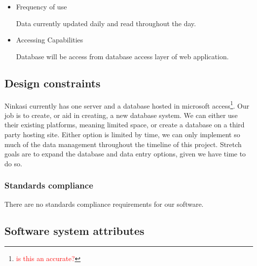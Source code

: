 \documentclass[draftclsnofoot,onecolumn,letterpaper,10pt,compsoc]{IEEEtran}
\newcommand\question[1]{\footnote{\textcolor{red}{#1}}}
\begin{document}
\begin{itemize}
\begin{itemize}
\begin{itemize}
                    \item{\textbf{S.G.}:
                        \question{What is this?}
                    }
                    \item{\textbf{pH}: pH level of batch in brewing vat.}
                    \item{\textbf{ABV}: Alcohol By Volumne of batch.}
                    \item{\textbf{Temp}: Temperature of batch.}
                    \item{\textbf{Action}: Action to be taken.}
                    \item{\textbf{By}: 
                        \question{Is this the person taking the action?}
                    }
                \end{itemize}
            \end{itemize}
        \item{Frequency of use}
        
            Data currently updated daily and read throughout the day.
            
        \item{Accessing Capabilities}
        
            Database will be access from database access layer of web application.
    \end{itemize}

	\subsection{Design constraints}
		Ninkasi currently has one server and a database hosted in microsoft access\question{is this an accurate?}.
		Our job is to create, or aid in creating, a new database system.
		We can either use their existing platforms, meaning limited space, or create a database on a third party hosting site.
		Either option is limited by time, we can only implement so much of the data management throughout the timeline of this project.
		Stretch goals are to expand the database and data entry options, given we have time to do so.

		\subsubsection{Standards compliance}

		There are no standards compliance requirements for our software.

	\subsection{Software system attributes}
\end{document}
